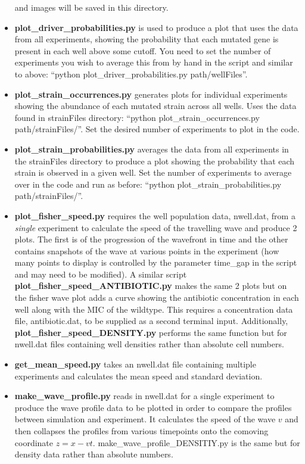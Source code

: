 \documentclass[a4paper,10pt]{article}
\begin{document}
\begin{itemize}
 and images will be saved in this directory.
 \item {\bf plot\_driver\_probabilities.py} is used to produce a plot that uses the data from all experiments, showing the probability that each mutated gene is present in each
 well above some cutoff. You need to set the number of experiments you wish to average this from by hand in the script and similar to above: 
 ``python plot\_driver\_probabilities.py path/wellFiles''.
 \item {\bf plot\_strain\_occurrences.py} generates plots for individual experiments showing the abundance of each mutated strain across all wells.
 Uses the data found in strainFiles directory: ``python plot\_strain\_occurrences.py path/strainFiles/''.
 Set the desired number of experiments to plot in the code. 
 \item {\bf plot\_strain\_probabilities.py} averages the data from all experiments in the strainFiles directory to produce a plot showing the probability that each strain
 is observed in a given well. Set the number of experiments to average over in the code and run as before: ``python plot\_strain\_probabilities.py path/strainFiles/''.
 \item {\bf plot\_fisher\_speed.py} requires the well population data, nwell.dat, from a \emph{single} experiment to calculate the speed of the travelling wave and produce 2 plots.
 The first is of the progression of the wavefront in time and the other contains snapshots of the wave at various points in the experiment (how many points to display is
 controlled by the parameter time\_gap in the script and may need to be modified).
 A similar script {\bf plot\_fisher\_speed\_ANTIBIOTIC.py} makes the same 2 plots but on the fisher wave plot adds a curve showing the antibiotic concentration
 in each well along with the MIC of the wildtype. This requires a concentration data file, antibiotic.dat, to be supplied as a second terminal input. 
 Additionally, {\bf plot\_fisher\_speed\_DENSITY.py} performs the same function but for nwell.dat files containing well densities rather than absolute cell numbers.
 \item {\bf get\_mean\_speed.py} takes an nwell.dat file containing multiple experiments and calculates the mean speed and standard deviation.
 \item {\bf make\_wave\_profile.py} reads in nwell.dat for a single experiment to produce the wave profile data to be plotted in order to compare
 the profiles between simulation and experiment.
 It calculates the speed of the wave $v$ and then collapses the profiles from various timepoints onto the comoving coordinate $z=x-vt$. 
 make\_wave\_profile\_DENSITIY.py is the same but for density data rather than absolute numbers.
\end{itemize}
\end{document}
